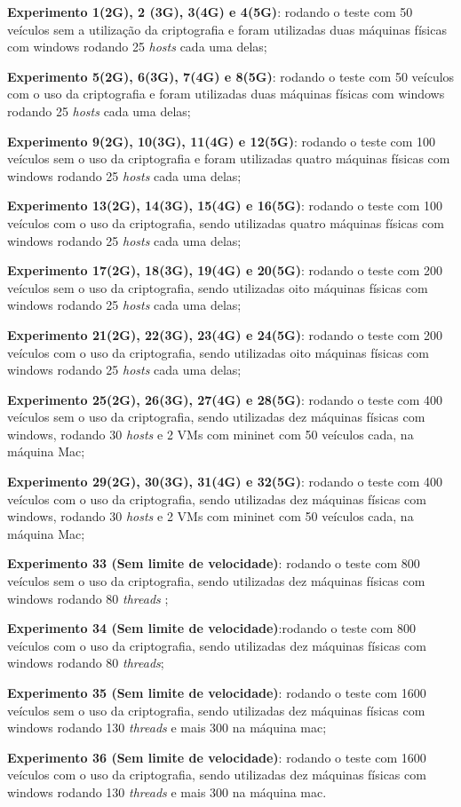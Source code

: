 \documentclass[
	12pt,				%
	oneside,			%
	a4paper,			%
	english,			%
	brazil				%
	]{abntex2ppgsi}
\begin{document}
\begin{itemize*}
	\item{\textbf{Experimento 1(2G), 2 (3G), 3(4G) e 4(5G)}: rodando o teste com 50  veículos sem a utilização da criptografia e foram utilizadas duas máquinas físicas com windows rodando 25 \textit{hosts} cada uma delas;}
	\item{\textbf{Experimento 5(2G), 6(3G), 7(4G) e 8(5G)}: rodando o teste com 50  veículos com o uso da criptografia e  foram utilizadas duas máquinas físicas com windows rodando 25 \textit{hosts} cada uma delas;}
	\item{\textbf{Experimento 9(2G), 10(3G), 11(4G) e 12(5G)}: rodando o teste com 100  veículos sem o uso da criptografia e foram utilizadas quatro máquinas físicas com windows rodando 25 \textit{hosts} cada uma delas;}
	\item{\textbf{Experimento 13(2G), 14(3G), 15(4G) e 16(5G)}: rodando o teste com 100  veículos com o uso da criptografia, sendo utilizadas quatro máquinas físicas com windows rodando 25 \textit{hosts} cada uma delas;}
	\item{\textbf{Experimento 17(2G), 18(3G), 19(4G) e 20(5G)}: rodando o teste com 200  veículos sem o uso da criptografia, sendo utilizadas oito máquinas físicas com windows rodando 25 \textit{hosts} cada uma delas;}
	\item{\textbf{Experimento 21(2G), 22(3G), 23(4G) e 24(5G)}: rodando o teste com 200  veículos com o uso da criptografia, sendo utilizadas oito máquinas físicas com windows rodando 25 \textit{hosts} cada uma delas;}
	\item{\textbf{Experimento 25(2G), 26(3G), 27(4G) e 28(5G)}: rodando o teste com 400  veículos sem o uso da criptografia, sendo utilizadas dez máquinas físicas com windows, rodando 30 \textit{hosts} e 2 VMs com mininet com 50 veículos cada, na máquina Mac;}
	\item{\textbf{Experimento 29(2G), 30(3G), 31(4G) e 32(5G)}: rodando o teste com 400  veículos com o uso da criptografia, sendo utilizadas dez máquinas físicas com windows, rodando 30 \textit{hosts} e 2 VMs com mininet com 50 veículos cada, na máquina Mac;}
	
	\item{\textbf{Experimento 33 (Sem limite de velocidade)}: rodando o teste com 800  veículos sem o uso da criptografia, sendo utilizadas dez máquinas físicas com windows rodando 80 \textit{threads} ;}	
	\item{\textbf{Experimento 34 (Sem limite de velocidade)}:rodando o teste com 800  veículos com o uso da criptografia, sendo utilizadas dez máquinas físicas com windows rodando 80 \textit{threads};}
	
	\item{\textbf{Experimento 35 (Sem limite de velocidade)}: rodando o teste com 1600  veículos sem o uso da criptografia, sendo utilizadas dez máquinas físicas com windows rodando 130 \textit{threads} e mais 300 na máquina mac;}
	\item{\textbf{Experimento 36 (Sem limite de velocidade)}: rodando o teste com 1600  veículos com o uso da criptografia, sendo utilizadas dez máquinas físicas com windows rodando 130 \textit{threads} e mais 300 na máquina mac.}
\end{itemize*}
\end{document}
